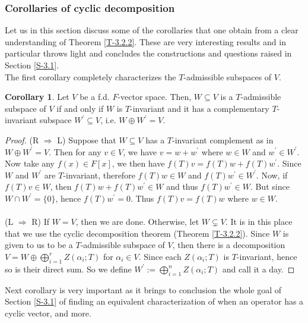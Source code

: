 \documentclass[letterpaper,11pt,twoside]{article}
\theoremstyle{definition}
\theoremstyle{definition}
\theoremstyle{definition}
\theoremstyle{definition}
\theoremstyle{definition}
\theoremstyle{definition}
\theoremstyle{remark}
\theoremstyle{definition}
\newtheorem{corollary}[proposition]{Corollary}
\begin{document}
    \subsubsection{Corollaries of cyclic decomposition}\label{S-3.2.1}
    Let us in this section discuss some of the corollaries that one obtain from a clear understanding of Theorem \ref{T-3.2.2}. These are very interesting results and in particular throws light and concludes the constructions and questions raised in Section \ref{S-3.1}.\\
    
    The first corollary completely characterizes the $ T $-admissible subspaces of $ V $.
    \begin{corollary}\label{C-3.2.3}
    	Let $ V $ be a f.d. $ F $-vector space. Then, $ W\subseteq  V$ is a $ T $-admissible subspace of $ V $ if and only if $ W $ is $ T $-invariant and it has a complementary $ T $-invariant subspace $ W^{\prime} \subseteq V $, i.e. $ W\oplus W^{\prime} = V $.
    \end{corollary}
\begin{proof}
	(R $ \Rightarrow $ L) Suppose that $ W \subseteq V$ has a $ T $-invariant complement as in $ W\oplus W^{\prime} =V $. Then for any $ v\in V $, we have $ v = w+ w^{\prime} $ where $ w\in W $ and $ w^{\prime} \in W^{\prime} $. Now take any $ f(x) \in F[x] $, we then have $ f(T)v = f(T)w + f(T)w^{\prime} $. Since $ W $ and $ W^{\prime} $ are $ T $-invariant, therefore $ f(T)w \in W $ and $ f(T)w^{\prime} \in W^{\prime} $. Now, if $ f(T)v \in W $, then $ f(T)w + f(T)w^{\prime} \in W $ and thus $ f(T)w^{\prime} \in W $. But since $ W\cap W^{\prime} = \{0\} $, hence $ f(T)w^{\prime} = 0 $. Thus $ f(T)v = f(T)w $ where $ w\in W $. \\\\
	(L $ \Rightarrow $ R) If $ W = V $, then we are done. Otherwise, let $ W\subsetneq V $. It is in this place that we use the cyclic decomposition theorem (Theorem \ref{T-3.2.2}). Since $ W $ is given to us to be a $ T$-admissible subspace of $ V $, then there is a decomposition $ V = W \oplus \bigoplus_{i=1}^{r} Z(\alpha_i;T) $ for $ \alpha_i\in V $. Since each $ Z(\alpha_{i};T) $ is $ T $-invariant, hence so is their direct sum. So we define $ W^{\prime} := \bigoplus_{i=1}^{n}Z(\alpha_{i};T) $ and call it a day.
\end{proof}
	Next corollary is very important as it brings to conclusion the whole goal of Section \ref{S-3.1} of finding an equivalent characterization of when an operator has a cyclic vector, and more.
\end{document}
